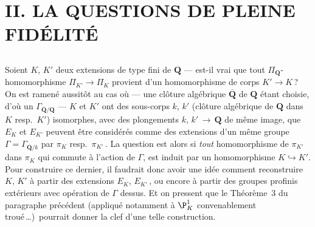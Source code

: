 











\chapter*{II. LA QUESTIONS DE PLEINE FIDÉLITÉ}
\label{ch:1950}
\section*{}

Soient $K$, $K'$ deux extensions de type fini de $\mathbf{Q}$ --- est-il vrai
que tout $\Pi_{\mathbf{Q}}$\nobreakdash-homo\-morphisme $\Pi_{K'} \to \Pi_K$ 
provient d'un homomorphisme de corps $K' \to K$\,? On est ramené 
aussitôt au cas où --- une clôture algébrique $\overline{\mathbf{Q}}$ de $\mathbf{Q}$ 
étant choisie, d'où un $\Gamma_{\overline{\mathbf{Q}}/\mathbf{Q}}$ ---  $K$ et $K'$ 
ont des sous-corps $k$, $k'$ (clôture algébrique de $\mathbf{Q}$ dans $K$
resp.\ $K'$) isomorphes, avec des plongements $k,\,k'\,\to\,\mathbf{Q}$ 
de même image, que $E_K$ et $E_{K'}$ peuvent être considérés comme
des extensions d'un même groupe $\Gamma = \Gamma_{\overline{\mathbf{Q}}/k}$
par $\pi_K$ resp.\ $\pi_{K'}\,$. La question est alors si {\it tout}
homomorphisme de $\pi_{K'}$ dans $\pi_K$ qui commute à l'action de 
$\Gamma$, est induit par un homomorphisme $K \hookrightarrow K'$. 
Pour construire ce dernier, il faudrait donc avoir une idée comment 
reconstruire $K$, $K'$ à partir des extensions $E_K$, $E_{K'}\,$, ou 
encore à partir des groupes profinis extérieurs avec opération de 
$\Gamma$ dessus. Et on pressent que le Théorème~3 du paragraphe 
précédent (appliqué notamment à $\P^1_K$ convenablement 
troué\,\dots)\ pourrait donner la clef d'une telle construction.

